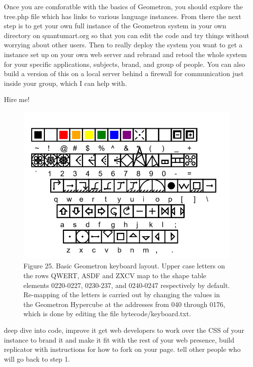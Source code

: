 \documentclass[11pt]{article}
\begin{document}
Once you are comforatble with the basics of Geometron, you should explore the tree.php file which has links to various language instances.  From there the next step is to get your own full instance of the Geometron system in your own directory on quantumart.org so that you can edit the code and try things without worrying about other users.  Then to really deploy the system you want to get a instance set up on your own web server and rebrand and retool the whole system for your specific applications, subjects, brand, and group of people.  You can also build a version of this on a local server behind a firewall for communication just inside your group, which I can help with.

Hire me! 


\begin{figure}

\includegraphics[width=\linewidth]{figures/figure_keyboard.png}

\caption{Figure 25. Basic Geometron keyboard layout. Upper case letters on the rows QWERT, ASDF and ZXCV map to the shape table elements 0220-0227, 0230-237, and 0240-0247 respectively by default.  Re-mapping of the letters is carried out by changing the values in the Geometron Hypercube at the addresses from 040 through 0176, which is done by editing the file bytecode/keyboard.txt.}
\end{figure}



deep dive into code, improve it
get web developers to work over the CSS of your instance to brand it and make it fit with the rest of your web presence, build replicator with instructions for how to fork on your page. 
tell other people who will go back to step 1.
\end{document}
